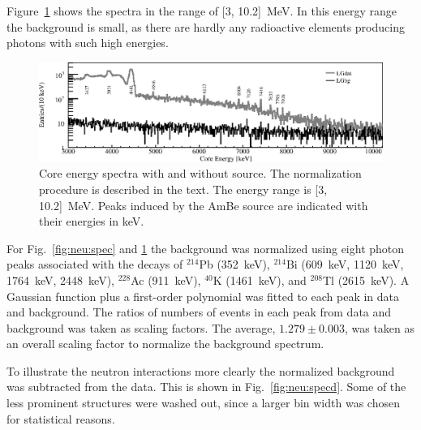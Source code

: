 Figure~\ref{fig:neu:specl} shows the spectra in the range of [3, 10.2]~MeV. In this energy range the background is small, as there are hardly any radioactive elements producing photons with such high energies.

\begin{figure}[tbhp]
  \centering
  \includegraphics[width=\textwidth,clip]{spectra_3_11MeV}
  \caption{Core energy spectra with and without source. The
    normalization procedure is described in the text. The energy range
    is [3, 10.2]~MeV. Peaks induced by the AmBe source are indicated
    with their energies in keV.}
  \label{fig:neu:specl}
\end{figure}

For Fig.~\ref{fig:neu:spec} and \ref{fig:neu:specl} the background was normalized using eight photon peaks associated with the decays of $^{214}$Pb (352~keV), $^{214}$Bi (609~keV, 1120~keV, 1764~keV, 2448~keV), $^{228}$Ac (911~keV), $^{40}$K (1461~keV), and $^{208}$Tl (2615~keV). A Gaussian function plus a first-order polynomial was fitted to each peak in data and background. The ratios of numbers of events in each peak from data and background was taken as scaling factors. The average, $1.279 \pm 0.003$, was taken as an overall scaling factor to normalize the background spectrum.

To illustrate the neutron interactions more clearly the normalized background was subtracted from the data. This is shown in Fig.~\ref{fig:neu:specd}. Some of the less prominent structures were washed out, since a larger bin width was chosen for statistical reasons.


